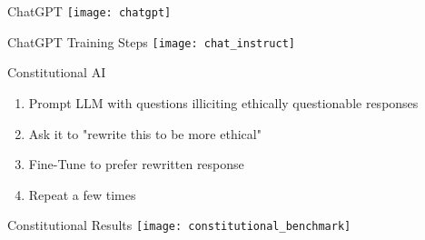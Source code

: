 \begin{frame}[c]{ChatGPT}
    \texttt{[image: chatgpt]} \\
\end{frame}

\begin{frame}[c]{ChatGPT Training Steps}
    \texttt{[image: chat\_instruct]} \\
\end{frame}

\begin{frame}[c]{Constitutional AI}
    \large
    \begin{enumerate}[<+(1)->]
        \item Prompt LLM with questions illiciting ethically questionable responses
        \item Ask it to "rewrite this to be more ethical"
        \item Fine-Tune to prefer rewritten response
        \item Repeat a few times
    \end{enumerate}
\end{frame}

\begin{frame}[c]{Constitutional Results}
    \texttt{[image: constitutional\_benchmark]} \\
\end{frame}
